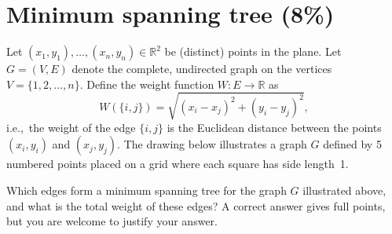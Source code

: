\newpage
\section{Minimum spanning tree (8\%)}\label{sec:last}

Let $(x_1,y_1),\ldots,(x_n,y_n) \in \mathbb{R}^2$ be (distinct) points in the plane.
Let $G = (V,E)$ denote the complete, undirected graph on the vertices $V = \{1,2,\ldots,n\}$.
Define the weight function $W : E \to \mathbb{R}$ as
$$W(\{i,j\}) = \sqrt{(x_i-x_j)^2+(y_i-y_j)^2},$$
i.e.,~the weight of the edge $\{i,j\}$ is the Euclidean distance between the points $(x_i,y_i)$ and $(x_j,y_j)$.
The drawing below illustrates a graph $G$ defined by 5 numbered points placed on a grid where each square has side length~1.

\begin{center}
\end{center}

{Which edges form a minimum spanning tree for the graph $G$ illustrated above, and what is the total weight of these edges? A correct answer gives full points, but you are welcome to justify your answer.}


